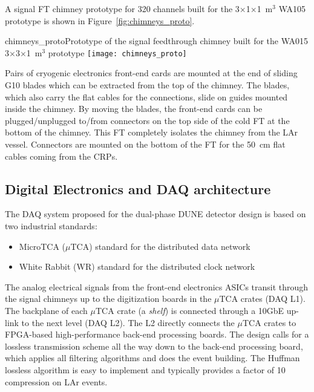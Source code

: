 A signal FT chimney prototype for 320 channels built for the
3$\times$1$\times$1~m$^3$ WA105 prototype is shown in
Figure~\ref{fig:chimneys_proto}.
\begin{cdrfigure}
{chimneys_proto}{Prototype of the signal feedthrough chimney built 
for the WA015 3$\times$3$\times$1~m$^3$ prototype}
\texttt{[image: chimneys\_proto]}
\end{cdrfigure}

Pairs of cryogenic electronics front-end cards are mounted at the end of
sliding G10 blades which can be extracted from the top of the
chimney. The blades, which also carry the flat cables for the
connections, slide on guides mounted inside the chimney. By
moving the blades, the front-end cards can be plugged/unplugged to/from 
connectors on the top side of the cold FT at
the bottom of the chimney. This FT completely isolates the
chimney from the LAr vessel. Connectors are mounted on the bottom of the FT 
for the 50~cm flat cables coming from the CRPs.

\subsection{Digital Electronics and DAQ architecture}
\label{sec:fd-alt-elec-daq}


The DAQ system  proposed for the dual-phase DUNE
detector design is based on two industrial standards:
\begin{itemize}
\item MicroTCA ($\mu$TCA) standard for the distributed data network\cite{mTCA-standard}
\item White Rabbit (WR) standard for the distributed clock network\cite{WR-standard}
\end{itemize}

The analog electrical signals from the front-end electronics ASICs transit through the signal chimneys up to the
digitization boards in the $\mu$TCA crates (DAQ L1).
The backplane of each $\mu$TCA crate (a \textit{shelf}) is connected through a 10GbE up-link
to the next level (DAQ L2). The L2 directly connects the $\mu$TCA crates
to FPGA-based high-performance back-end processing boards. 
The design calls for a lossless transmission scheme all the way down to the
back-end processing board, which applies all filtering algorithms and
does the event building. The Huffman lossless algorithm is easy to
implement and typically provides a factor  of 10 compression on LAr events.

